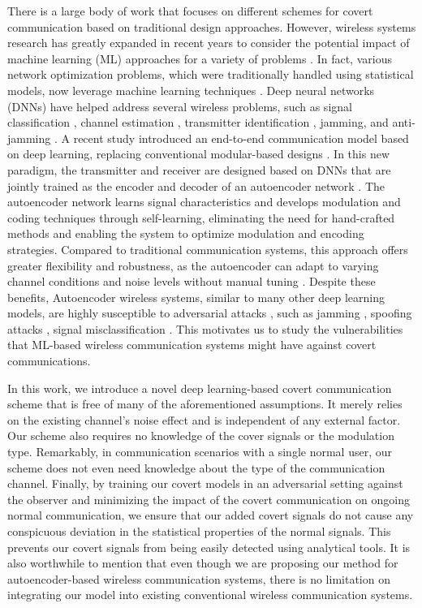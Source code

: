 There is a large body of work that focuses on different schemes for covert communication based on traditional design approaches. However, wireless systems research has greatly expanded in recent years to consider the potential impact of machine learning (ML) approaches for a variety of problems \cite{wang2017deep}. In fact, various network optimization problems, which were traditionally handled using statistical models, now leverage machine learning techniques \cite{zhu2020toward}. Deep neural networks (DNNs) have helped address several wireless problems, such as signal classification \cite{o2016radio, o2017introduction, wu2020deep, makkuva2021ko}, channel estimation \cite{soltani2019deep}, transmitter identification \cite{roy2019rfal, hanna2019deep}, jamming, and anti-jamming \cite{arjoune2020novel, bahramali2021robust}. A recent study introduced an end-to-end communication model based on deep learning, replacing conventional modular-based designs \cite{o2017introduction}. In this new paradigm, the transmitter and receiver are designed based on DNNs that are jointly trained as the encoder and decoder of an autoencoder network \cite{o2017introduction}. The autoencoder network learns signal characteristics and develops modulation and coding techniques through self-learning, eliminating the need for hand-crafted methods and enabling the system to optimize modulation and encoding strategies. Compared to traditional communication systems, this approach offers greater flexibility and robustness, as the autoencoder can adapt to varying channel conditions and noise levels without manual tuning \cite{zou2021channel}. Despite these benefits, Autoencoder wireless systems, similar to many other deep learning models, are highly susceptible to adversarial attacks \cite{chakraborty2018adversarial}, such as jamming \cite{bahramali2021robust}, spoofing attacks \cite{shi2020generative}, signal misclassification \cite{sadeghi2019physical}. This motivates us to study the vulnerabilities that ML-based wireless communication systems might have against covert communications.

In this work, we introduce a novel deep learning-based covert communication scheme that is free of many of the aforementioned assumptions. It merely relies on the existing channel's noise effect and is independent of any external factor. Our scheme also requires no knowledge of the cover signals or the modulation type. Remarkably, in communication scenarios with a single normal user, our scheme does not even need knowledge about the type of the communication channel. Finally, by training our covert models in an adversarial setting against the observer and minimizing the impact of the covert communication on ongoing normal communication, we ensure that our added covert signals do not cause any conspicuous deviation in the statistical properties of the normal signals. This prevents our covert signals from being easily detected using analytical tools. It is also worthwhile to mention that even though we are proposing our method for autoencoder-based wireless communication systems, there is no limitation on integrating our model into existing conventional wireless communication systems.


